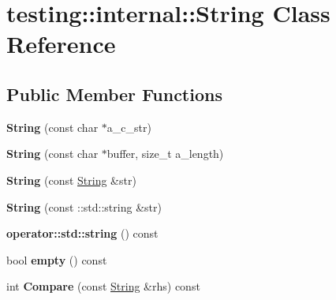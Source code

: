 \hypertarget{classtesting_1_1internal_1_1_string}{}\section{testing\+:\+:internal\+:\+:String Class Reference}
\label{classtesting_1_1internal_1_1_string}
\subsection*{Public Member Functions}
\begin{DoxyCompactItemize}
\item 
\mbox{\label{classtesting_1_1internal_1_1_string_a5fc98b7f804652f41833b9a6ad3d4aa4}} 
{\bfseries String} (const char $\ast$a\+\_\+c\+\_\+str)
\item 
\mbox{\label{classtesting_1_1internal_1_1_string_af0d4c587ba289f492fb082384519ba28}} 
{\bfseries String} (const char $\ast$buffer, size\+\_\+t a\+\_\+length)
\item 
\mbox{\label{classtesting_1_1internal_1_1_string_a33f47d549f34028bb5bbd23d5af774f5}} 
{\bfseries String} (const \mbox{\hyperlink{classtesting_1_1internal_1_1_string}{String}} \&str)
\item 
\mbox{\label{classtesting_1_1internal_1_1_string_adee057e43bcc56a2e5ba04812d01e95a}} 
{\bfseries String} (const \+::std\+::string \&str)
\item 
\mbox{\label{classtesting_1_1internal_1_1_string_a78d3e125ab7cc3c236472e0fa7e988db}} 
{\bfseries operator\+::std\+::string} () const
\item 
\mbox{\label{classtesting_1_1internal_1_1_string_a80ec586e4052e06daf27d6fd627e0792}} 
bool {\bfseries empty} () const
\item 
\mbox{\label{classtesting_1_1internal_1_1_string_a3e4058b689599dca25fd1206df136e4b}} 
int {\bfseries Compare} (const \mbox{\hyperlink{classtesting_1_1internal_1_1_string}{String}} \&rhs) const

\end{DoxyCompactItemize}
